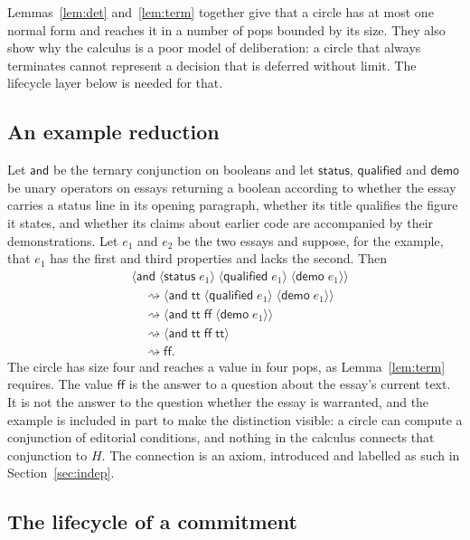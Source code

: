 \documentclass[11pt]{article}
\theoremstyle{plain}
\theoremstyle{definition}
\theoremstyle{remark}
\newcommand{\Hyp}{H}
\newcommand{\red}{\rightsquigarrow}
\newcommand{\cir}[2]{\langle #1\;#2\rangle}
\begin{document}
Lemmas~\ref{lem:det} and~\ref{lem:term} together give that a circle has at most one normal form and reaches it in a number of pops bounded by its size. They also show why the calculus is a poor model of deliberation: a circle that always terminates cannot represent a decision that is deferred without limit. The lifecycle layer below is needed for that.

\subsection{An example reduction}

Let $\mathsf{and}$ be the ternary conjunction on booleans and let $\mathsf{status}$, $\mathsf{qualified}$ and $\mathsf{demo}$ be unary operators on essays returning a boolean according to whether the essay carries a status line in its opening paragraph, whether its title qualifies the figure it states, and whether its claims about earlier code are accompanied by their demonstrations. Let $e_1$ and $e_2$ be the two essays and suppose, for the example, that $e_1$ has the first and third properties and lacks the second. Then
\begin{align*}
&\cir{\mathsf{and}}{\cir{\mathsf{status}}{e_1}\;\cir{\mathsf{qualified}}{e_1}\;\cir{\mathsf{demo}}{e_1}}\\
&\quad\red\cir{\mathsf{and}}{\mathsf{tt}\;\cir{\mathsf{qualified}}{e_1}\;\cir{\mathsf{demo}}{e_1}}\\
&\quad\red\cir{\mathsf{and}}{\mathsf{tt}\;\mathsf{ff}\;\cir{\mathsf{demo}}{e_1}}\\
&\quad\red\cir{\mathsf{and}}{\mathsf{tt}\;\mathsf{ff}\;\mathsf{tt}}\\
&\quad\red\mathsf{ff}.
\end{align*}
The circle has size four and reaches a value in four pops, as Lemma~\ref{lem:term} requires. The value $\mathsf{ff}$ is the answer to a question about the essay's current text. It is not the answer to the question whether the essay is warranted, and the example is included in part to make the distinction visible: a circle can compute a conjunction of editorial conditions, and nothing in the calculus connects that conjunction to $\Hyp$. The connection is an axiom, introduced and labelled as such in Section~\ref{sec:indep}.

\subsection{The lifecycle of a commitment}\label{sec:lifecycle}
\end{document}

